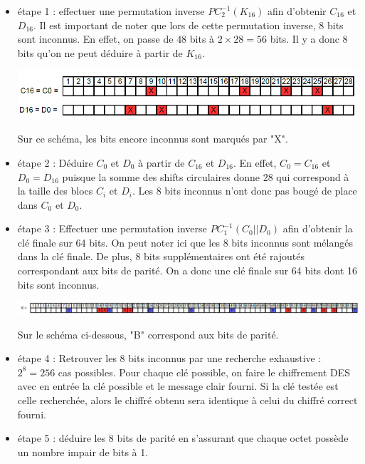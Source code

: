 \documentclass[11pt]{article}
\begin{document}
\begin{itemize}
	\item étape 1 : effectuer une permutation inverse $PC_{2}^{-1}(K_{16})$ afin d'obtenir $C_{16}$ et $D_{16}$.
	Il est important de noter que lors de cette permutation inverse, 8 bits sont inconnus. En effet, on passe de $48$ bits à $2 \times 28 = 56$ bits. Il y a donc 8 bits qu'on ne peut déduire à partir de $K_{16}$. \newline
	
	\begin{center}\includegraphics[scale=0.4]{../pictures/C0_D0.png}\end{center}
	
	Sur ce schéma, les bits encore inconnus sont marqués par "X". \newline
	
	
	\item étape 2 : Déduire $C_{0}$ et $D_{0}$ à partir de $C_{16}$ et $D_{16}$. En effet, $C_{0}=C_{16}$ et $D_{0}=D_{16}$ puisque la somme des shifts circulaires donne $28$ qui correspond à la taille des blocs $C_i$ et $D_i$. Les 8 bits inconnus n'ont donc pas bougé de place dans $C_0$ et $D_0$. \newline
	
	\item étape 3 : Effectuer une permutation inverse $PC_{1}^{-1}(C_{0}||D_{0})$ afin d'obtenir la clé finale sur 64 bits. On peut noter ici que les 8 bits inconnus sont mélangés dans la clé finale. De plus, 8 bits supplémentaires ont été rajoutés correspondant aux bits de parité. On a donc une clé finale sur 64 bits dont 16 bits sont inconnus. \newline
	
	\begin{center}\includegraphics[scale=0.5]{../pictures/K64.png}\end{center}
	
	Sur le schéma ci-dessous, "B" correspond aux bits de parité. \newline
	
	\item étape 4 : Retrouver les 8 bits inconnus par une recherche exhaustive : $2^{8}=256$ cas possibles. Pour chaque clé possible, on faire le chiffrement DES avec en entrée la clé possible et le message clair fourni. Si la clé testée est celle recherchée, alors le chiffré obtenu sera identique à celui du chiffré correct fourni. \newline
	
	\item étape 5 : déduire les 8 bits de parité en s'assurant que chaque octet possède un nombre impair de bits à 1. 
	
	
\end{itemize}
\end{document}
